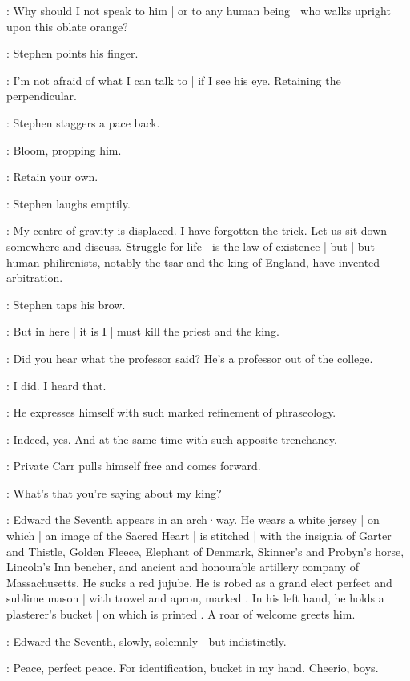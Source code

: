 \Stephen:
Why should I not speak to him |
or to any human being |
who walks upright upon this oblate orange?

:
Stephen points his finger.

\Stephen:
I'm not afraid of what I can talk to |
if I see his eye.
Retaining the perpendicular.

:
Stephen staggers a pace back.

:
Bloom,
propping him.

\Bloom:
Retain your own.

:
Stephen laughs emptily.

\Stephen:
My centre of gravity is displaced.
I have forgotten the trick.
Let us sit down somewhere and discuss.
Struggle for life |
is the law of existence |
but |
but human philirenists,
notably the tsar and the king of England,
have invented arbitration.

:
Stephen taps his brow.

\Stephen:
But in here |
it is I |
must kill the priest and the king.

\BiddyClap[2]:
Did you hear what the professor said?
He's a professor out of the college.

\CuntyKate[2]:
I did.
I heard that.

\BiddyClap[2]:
He expresses himself with such marked refinement of phraseology.

\CuntyKate[2]:
Indeed,
yes.
And at the same time with such apposite trenchancy.

:
Private Carr pulls himself free and comes forward.

\Carr:
What's that you're saying about my king?

:
Edward the Seventh appears in an arch·way.
He wears a white jersey |
on which |
an image of the Sacred Heart |
%
is stitched |
with the insignia of Garter and Thistle,
Golden Fleece,
Elephant of Denmark,
Skinner's and Probyn's horse,
Lincoln's Inn bencher,
and ancient and honourable artillery company of Massachusetts.
He sucks a red jujube.
He is robed as a grand elect perfect and sublime mason |
with trowel and apron,
marked .
In his left hand,
he holds a plasterer's bucket |
on which is printed .
A roar of welcome greets him.

:
Edward the Seventh,
slowly,
solemnly |
but indistinctly.

\EdwardSeventh:
Peace,
perfect peace.
For identification,
bucket in my hand.
%
Cheerio,
boys.

